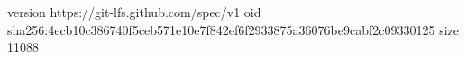 version https://git-lfs.github.com/spec/v1
oid sha256:4ecb10c386740f5ceb571e10e7f842ef6f2933875a36076be9cabf2c09330125
size 11088
